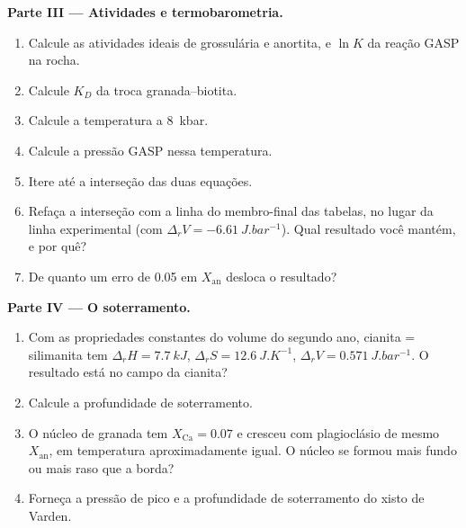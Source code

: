 \begin{problem}
\medskip\noindent\textbf{Parte III --- Atividades e termobarometria.}
\begin{enumerate}[resume]
  \item Calcule as atividades ideais de grossulária e anortita, e $\ln K$
        da reação GASP na rocha.
  \item Calcule $K_D$ da troca granada--biotita.
  \item Calcule a temperatura a \qty{8}{kbar}.
  \item Calcule a pressão GASP nessa temperatura.
  \item Itere até a interseção das duas equações.
  \item Refaça a interseção com a linha do membro-final das tabelas, no lugar da
        linha experimental (com $\Delta_rV = \qty{-6.61}{J.bar^{-1}}$).
        Qual resultado você mantém, e por quê?
  \item De quanto um erro de 0.05 em $X_{\text{an}}$ desloca o
        resultado?
\end{enumerate}

\medskip\noindent\textbf{Parte IV --- O soterramento.}
\begin{enumerate}[resume]
  \item Com as propriedades constantes do volume do segundo ano, cianita =
        silimanita tem $\Delta_rH = \qty{7.7}{kJ}$, $\Delta_rS =
        \qty{12.6}{J.K^{-1}}$, $\Delta_rV = \qty{0.571}{J.bar^{-1}}$. O resultado está
        no campo da cianita?
  \item Calcule a profundidade de soterramento.
  \item O núcleo de granada tem $X_{\text{Ca}} = 0.07$ e cresceu com plagioclásio
        de mesmo $X_{\text{an}}$, em temperatura aproximadamente igual. O núcleo se
        formou mais fundo ou mais raso que a borda?
  \item Forneça a pressão de pico e a profundidade de soterramento do xisto de Varden.
\end{enumerate}
\end{problem}
